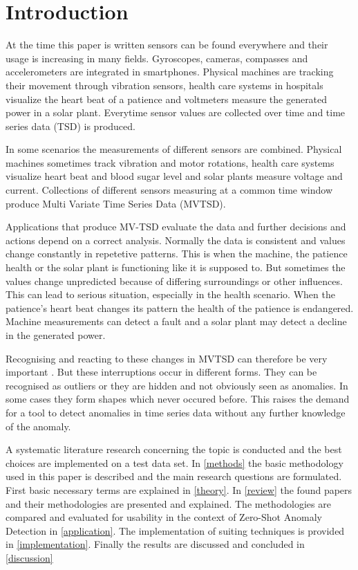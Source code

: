 \section{Introduction}\label{intro}
At the time this paper is written sensors can be found everywhere and their usage is increasing in many fields. Gyroscopes, cameras, compasses and accelerometers are integrated in smartphones. Physical machines are tracking their movement through vibration sensors, health care systems in hospitals visualize the heart beat of a patience and voltmeters measure the generated power in a solar plant. Everytime sensor values are collected over time and time series data (TSD) is produced.

In some scenarios the measurements of different sensors are combined. Physical machines sometimes track vibration and motor rotations, health care systems visualize heart beat and blood sugar level and solar plants measure voltage and current.
Collections of different sensors measuring at a common time window produce Multi Variate Time Series Data (MVTSD).

Applications that produce MV-TSD evaluate the data and further decisions and actions depend on a correct analysis.
Normally the data is consistent and values change constantly in repetetive patterns. This is when the machine, the patience health or the solar plant is functioning like it is supposed to. But sometimes the values change unpredicted because of differing surroundings or other influences. This can lead to serious situation, especially in the health scenario. When the patience's heart beat changes its pattern the health of the patience is endangered. Machine measurements can detect a fault and a solar plant may detect a decline in the generated power.

Recognising and reacting to these changes in MVTSD can therefore be very important%
. But these interruptions occur in different forms. They can be recognised as outliers or they are hidden and not obviously seen as anomalies. In some cases they form shapes which never occured before. This raises the demand for a tool to detect anomalies in time series data without any further knowledge of the anomaly.


A systematic literature research concerning the topic is conducted and the best choices are implemented on a test data set. In \ref{methods} the basic methodology used in this paper is described and the main research questions are formulated. First basic necessary terms are explained in \ref{theory}. In \ref{review} the found papers and their methodologies are presented and explained. The methodologies are compared and evaluated for usability in the context of Zero-Shot Anomaly Detection in \ref{application}. The implementation of suiting techniques is provided in \ref{implementation}. Finally the results are discussed and concluded in \ref{discussion}
